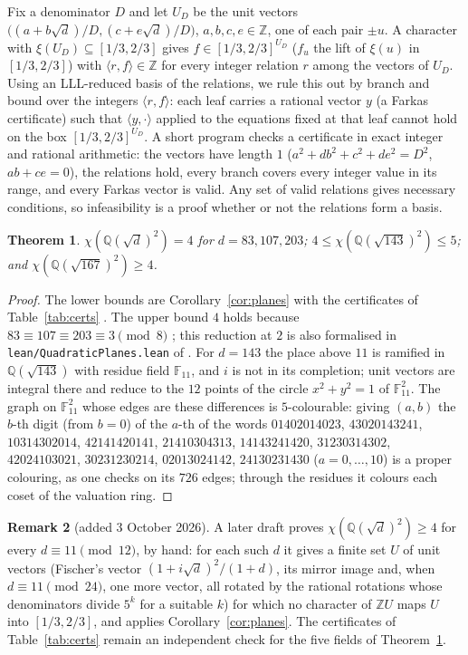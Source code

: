 \documentclass[11pt,a4paper]{amsart}
\newtheorem{theorem}{Theorem}
\theoremstyle{definition}
\newtheorem{remark}[theorem]{Remark}
\newcommand{\Q}{\mathbb{Q}}
\newcommand{\Z}{\mathbb{Z}}
\begin{document}
Fix a denominator $D$ and let $U_D$ be the unit vectors $\bigl((a+b\sqrt d)/D,(c+e\sqrt d)/D\bigr)$, $a,b,c,e\in\Z$,
one of each pair $\pm u$. A character with $\xi(U_D)\subseteq[1/3,2/3]$ gives $f\in[1/3,2/3]^{U_D}$ ($f_u$ the lift
of $\xi(u)$ in $[1/3,2/3]$) with $\langle r,f\rangle\in\Z$ for every integer relation $r$ among the vectors of
$U_D$. Using an LLL-reduced basis of the relations, we rule this out by branch and bound over the integers
$\langle r,f\rangle$: each leaf carries a rational vector $y$ (a Farkas certificate) such that
$\langle y,\cdot\rangle$ applied to the equations fixed at that leaf cannot hold on the box $[1/3,2/3]^{U_D}$. A
short program checks a certificate in exact integer and rational arithmetic: the vectors have length $1$
($a^2+db^2+c^2+de^2=D^2$, $ab+ce=0$), the relations hold, every branch covers every integer value in its range, and
every Farkas vector is valid. Any set of valid relations gives necessary conditions, so infeasibility is a proof
whether or not the relations form a basis.

\begin{theorem}\label{thm:fields}
$\chi(\Q(\sqrt d)^2)=4$ for $d=83,107,203$; $4\le\chi(\Q(\sqrt{143})^2)\le5$; and $\chi(\Q(\sqrt{167})^2)\ge4$.
\end{theorem}

\begin{proof}
The lower bounds are Corollary~\ref{cor:planes} with the certificates of Table~\ref{tab:certs} \cite{Repo}. The
upper bound $4$ holds because $83\equiv107\equiv203\equiv3\pmod8$ \cite[Theorem~10]{Fischer1990}; this reduction at
$2$ is also formalised in \texttt{lean/QuadraticPlanes.lean} of \cite{Repo}. For $d=143$ the place above $11$ is ramified in $\Q(\sqrt{143})$ with residue field
$\mathbb{F}_{11}$, and $i$ is not in its completion; unit vectors are integral there and reduce to the $12$ points of the circle
$x^2+y^2=1$ of $\mathbb{F}_{11}^2$. The graph on $\mathbb{F}_{11}^2$ whose edges are these differences is
$5$-colourable: giving $(a,b)$ the $b$-th digit (from $b=0$) of the $a$-th of the words
$01402014023$, $43020143241$, $10314302014$, $42141420141$, $21410304313$, $14143241420$, $31230314302$,
$42024103021$, $30231230214$, $02013024142$, $24130231430$ ($a=0,\dots,10$) is a proper colouring, as one checks on
its $726$ edges; through the residues it colours each coset of the valuation ring.
\end{proof}

\begin{remark}[added 3 October 2026]\label{rem:FC}
A later draft \cite{FC} proves $\chi(\Q(\sqrt d)^2)\ge4$ for every $d\equiv11\pmod{12}$, by hand: for each such $d$
it gives a finite set $U$ of unit vectors (Fischer's vector $(1+i\sqrt d)^2/(1+d)$, its mirror image and, when
$d\equiv11\pmod{24}$, one more vector, all rotated by the rational rotations whose denominators divide $5^k$ for a
suitable $k$) for which no character of $\Z U$ maps $U$ into $[1/3,2/3]$, and applies Corollary~\ref{cor:planes}. The
certificates of Table~\ref{tab:certs} remain an independent check for the five fields of Theorem~\ref{thm:fields}.
\end{remark}
\end{document}

